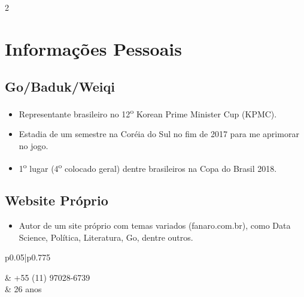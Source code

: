 \documentclass[10pt]{article} %
\begin{document}
\begin{paracol}{2}
\section{Informações Pessoais}

    \subsection*{Go/Baduk/Weiqi}
    
        \begin{itemize}
        
            \itemsep0em
            \item Representante brasileiro no 12\textsuperscript{o} Korean Prime Minister Cup (KPMC).
            \item Estadia de um semestre na Coréia do Sul no fim de 2017 para me aprimorar no jogo.
            \item 1\textsuperscript{o} lugar (4\textsuperscript{o} colocado geral) dentre brasileiros na Copa do Brasil 2018.
            
        \end{itemize}

    \subsection*{Website Próprio}
    
        \begin{itemize}
        
            \itemsep0em
            \item Autor de um site próprio com temas variados (fanaro.com.br), como Data Science, Política, Literatura, Go, dentre outros.
            
        \end{itemize}


\switchcolumn

\parbox[top][0.12\textheight][c]{\linewidth}{
	\vspace{-0.04\textheight}
	\colorbox{shade}{
		\begin{supertabular}{p{0.05\linewidth}|p{0.775\linewidth}}
		
        	\raisebox{-1pt}{\faPhone} & +55 (11) 97028-6739 \\
        	
        	\raisebox{-1pt}{\faMale} & 26 anos \\
        	

\end{supertabular}}}
\end{paracol}
\end{document}
